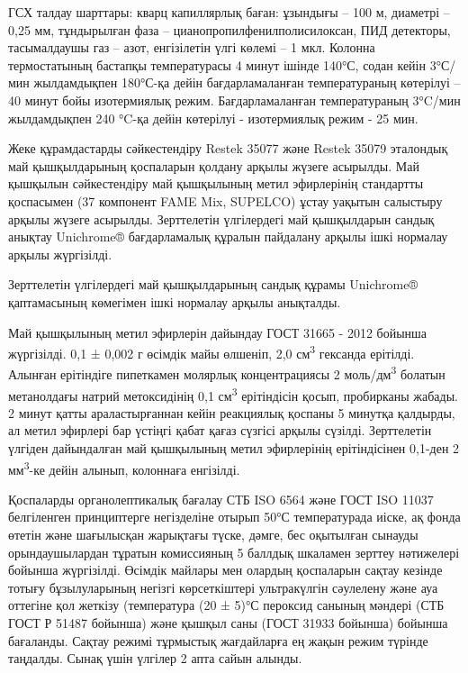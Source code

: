 ГСХ талдау шарттары: кварц капиллярлық баған: ұзындығы -- 100 м,
диаметрі -- 0,25 мм, тұндырылған фаза -- цианопропилфенилполисилоксан,
ПИД детекторы, тасымалдаушы газ -- азот, енгізілетін үлгі көлемі -- 1
мкл. Колонна термостатының бастапқы температурасы 4 минут ішінде 140°С,
содан кейін 3°С/мин жылдамдықпен 180°С-қа дейін бағдарламаланған
температураның көтерілуі -- 40 минут бойы изотермиялық режим.
Бағдарламаланған температураның 3°C/мин жылдамдықпен 240 °C-қа дейін
көтерілуі - изотермиялық режим - 25 мин.

Жеке құрамдастарды сәйкестендіру Restek 35077 және Restek 35079
эталондық май қышқылдарының қоспаларын қолдану арқылы жүзеге асырылды.
Май қышқылын сәйкестендіру май қышқылының метил эфирлерінің стандартты
қоспасымен (37 компонент FAME Mix, SUPELCO) ұстау уақытын салыстыру
арқылы жүзеге асырылды. Зерттелетін үлгілердегі май қышқылдарын сандық
анықтау Unichrome® бағдарламалық құралын пайдалану арқылы ішкі нормалау
арқылы жүргізілді.

Зерттелетін үлгілердегі май қышқылдарының сандық құрамы Unichrome®
қаптамасының көмегімен ішкі нормалау арқылы анықталды.

Май қышқылының метил эфирлерін дайындау ГОСТ 31665 - 2012 бойынша
жүргізілді. 0,1 ± 0,002 г өсімдік майы өлшеніп, 2,0
см\textsuperscript{3} гександа ерітілді. Алынған ерітіндіге пипеткамен
молярлық концентрациясы 2 моль/дм\textsuperscript{3} болатын метанолдағы
натрий метоксидінің 0,1 см\textsuperscript{3} ерітіндісін қосып,
пробирканы жабады. 2 минут қатты араластырғаннан кейін реакциялық
қоспаны 5 минутқа қалдырды, ал метил эфирлері бар үстіңгі қабат қағаз
сүзгісі арқылы сүзілді. Зерттелетін үлгіден дайындалған май қышқылының
метил эфирлерінің ерітіндісінен 0,1-ден 2 мм\textsuperscript{3}-ке дейін
алынып, колоннаға енгізілді.

Қоспаларды органолептикалық бағалау СТБ ISO 6564 және ГОСТ ISO 11037
белгіленген принциптерге негізделіне отырып 50°С температурада иіске, ақ
фонда өтетін және шағылысқан жарықтағы түске, дәмге, бес оқытылған
сынауды орындаушылардан тұратын комиссияның 5 баллдық шкаламен зерттеу
нәтижелері бойынша жүргізілді. Өсімдік майлары мен олардың қоспаларын
сақтау кезінде тотығу бұзылуларының негізгі көрсеткіштері ультракүлгін
сәулелену және ауа оттегіне қол жеткізу (температура (20 ± 5)°С пероксид
санының мәндері (СТБ ГОСТ Р 51487 бойынша) және қышқыл саны (ГОСТ 31933
бойынша) бойынша бағаланды. Сақтау режимі тұрмыстық жағдайларға ең жақын
режим түрінде таңдалды. Сынақ үшін үлгілер 2 апта сайын алынды.

